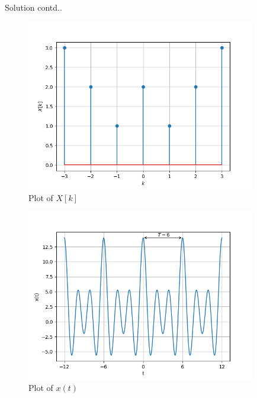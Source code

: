 \documentclass{beamer}
\begin{document}
\begin{frame}{Solution contd..}
\begin{figure}[!h]
         \centering
         \includegraphics[width=10cm]{plot_X[k].png}
         \caption{Plot of $X[k]$}
         \label{plot}
\end{figure}
\end{frame}
\begin{frame}
\begin{figure}[!h]
         \centering
         \includegraphics[width=10cm]{plot_x(t).png}
         \caption{Plot of $x(t)$}
         \label{plot}
\end{figure}
\end{frame}
\end{document}
